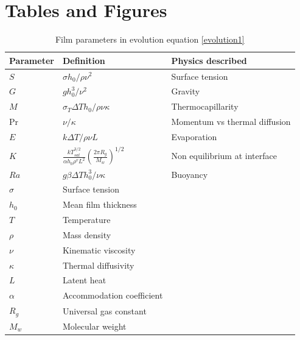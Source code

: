 \documentclass[a4paper,12pt]{article}
\begin{document}
                

%                
	


\clearpage


\section{Tables and Figures}

\begin{table}[h]
\centering
\begin{tabular}{|l|p{4cm}|p{4cm}|}
\hline
 Parameter & Definition & Physics described\\
\hline
$S$ & $\sigma h_0/\rho \nu^2$ & Surface tension \\
$G$ & $g h_0^3/\nu^2$  & Gravity\\
$M$ & $\sigma_T \Delta T h_0/\rho\nu\kappa$  & Thermocapillarity\\
Pr & $\nu/\kappa$ &  Momentum vs thermal diffusion\\
$E$ & $k \Delta T/\rho\nu L$ & Evaporation\\
$K$ & $\frac{k T_{sat}^{3/2}}{\alpha h_0 \rho^v L^2} \left(\frac{2 \pi R_g}{M_w}\right)^{1/2}$ & Non equilibrium at interface \\
$Ra$ & $g \beta \Delta T h_0^3/\nu\kappa$ & Buoyancy \\
$\sigma$ & Surface tension & \\
$h_0$ & Mean film thickness & \\
$T$ & Temperature & \\
$\rho$ & Mass density & \\
$\nu$ & Kinematic viscosity & \\
$\kappa$ & Thermal diffusivity & \\
$L$ & Latent heat & \\
$\alpha$ & Accommodation coefficient & \\
$R_g$ & Universal gas constant & \\
$M_w$ & Molecular weight & \\
\hline
\end{tabular}
\caption{Film parameters in evolution equation \ref{evolution1}}
\label{tab:nomenclature}
\end{table}
\clearpage
\end{document}

